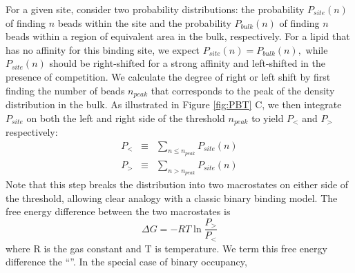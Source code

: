 For a given site, consider %
two probability distributions: the probability $P_{site}(n)$ of finding $n$ beads within the site and the probability $P_{bulk}(n)$ of finding $n$ beads within a region of equivalent area in the bulk, respectively.   For a lipid that has no affinity for this binding site, we expect $P_{site}(n) = P_{bulk}(n),$ while $P_{site}(n)$ should be right-shifted for a strong affinity and left-shifted in the presence of competition. %
We calculate the degree of right or left shift by first finding the number of beads $n_{peak}$ that corresponds to the peak of the density distribution in the bulk. As illustrated in Figure \ref{fig:PBT} C, we then integrate $P_{site}$ on both the left and right side of the threshold $n_{peak}$ to yield $P_{<}$ and $P_{>}$ respectively:
\begin{eqnarray}
    P_{<}& \equiv &\sum\nolimits_{n\le n_{peak}} P_{site}(n) \label{eq:Pl} \\
    P_{>}& \equiv &\sum\nolimits_{n>n_{peak}} P_{site}(n)  \label{eq:Pg}
\end{eqnarray}
Note that this step breaks the distribution into two macrostates on either side of the threshold, allowing clear analogy with a classic binary binding model.  %
The free energy difference between the two macrostates is
\begin{equation}
\Delta G = -RT\ln\frac{P_{>}}{P_{<}}
\label{eq:dG}
\end{equation}
where R is the gas constant and T is temperature. We term this free energy difference the ``\newaffinity''.  In the special case of binary occupancy, 
